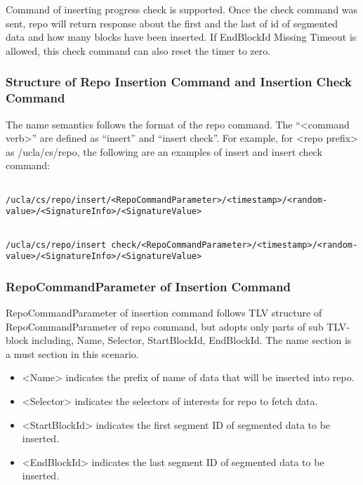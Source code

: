 \documentclass{acm_proc_article-sp}
\begin{document}
Command of inserting progress check is supported. Once the check command was sent, repo will return response about the first and the last of id of segmented data and how many blocks have been inserted. If EndBlockId Missing Timeout is allowed, this check command can also reset the timer to zero.

\subsubsection{Structure of Repo Insertion Command and Insertion Check Command}
The name semantics follows the format of the repo command. The ``<command verb>'' are defined as ``insert'' and ``insert check''. For example, for <repo prefix> as /ucla/cs/repo, the following are an examples of insert and insert check command:

\begin{figure*}
\begin{framed}
\begin{BVerbatim}

/ucla/cs/repo/insert/<RepoCommandParameter>/<timestamp>/<random-value>/<SignatureInfo>/<SignatureValue>

\end{BVerbatim}
\end{framed}
\end{figure*}

\begin{figure*}
\begin{framed}
\begin{BVerbatim}

/ucla/cs/repo/insert check/<RepoCommandParameter>/<timestamp>/<random-value>/<SignatureInfo>/<SignatureValue>

\end{BVerbatim}
\end{framed}
\end{figure*}


\subsubsection{RepoCommandParameter of Insertion Command}
RepoCommandParameter of insertion command follows TLV structure of RepoCommandParameter of repo command, but adopts only parts of sub TLV-block including, Name, Selector, StartBlockId, EndBlockId. The name section is a must section in this scenario.

\begin{itemize}
\item <Name> indicates the prefix of name of data that will be inserted into repo.
\item <Selector> indicates the selectors of interests for repo to fetch data.
\item <StartBlockId> indicates the first segment ID of segmented data to be inserted.
\item <EndBlockId> indicates the last segment ID of segmented data to be inserted.
\end{itemize}
\end{document}
